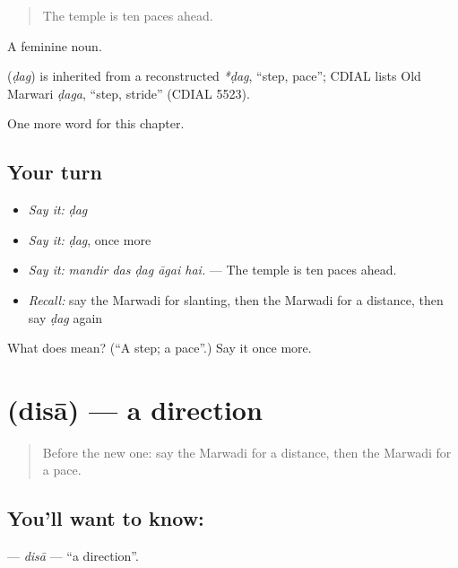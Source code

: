 \begin{quote}
The temple is ten paces ahead.
\end{quote}

A feminine noun.

\begin{cousinweb}
\textbf{} (\emph{ḍag}) is inherited from a reconstructed \emph{*ḍag}, \textquotedblleft{}step, pace\textquotedblright{}; CDIAL lists Old Marwari \emph{ḍaga}, \textquotedblleft{}step, stride\textquotedblright{} (CDIAL 5523).
\end{cousinweb}

\begin{grammarlens}[title={What you've built}]
One more word for this chapter.
\end{grammarlens}

\subsection*{Your turn}
\begin{itemize}
\raggedright
  \item \emph{Say it:} \emph{ḍag}
  \item \emph{Say it:} \emph{ḍag}, once more
  \item \emph{Say it:} \emph{mandir das ḍag āgai hai.} — The temple is ten paces ahead.
  \item \emph{Recall:} say the Marwadi for slanting, then the Marwadi for a distance, then say \emph{ḍag} again
\end{itemize}

\begin{tcolorbox}[breakable,colback=teal!4,colframe=teal!35!black,title={Before you move on}]
What does  mean? (\textquotedblleft{}A step; a pace\textquotedblright{}.) Say it once more.
\end{tcolorbox}
\section[\texorpdfstring{\mw{दिसा} (disā)}{दिसा (disā)}]{ (disā) — a direction}

\label{lesson:MW-C203-disa}



\begin{quote}
Before the new one: say the Marwadi for a distance, then the Marwadi for a pace.
\end{quote}

\subsection*{You'll want to know: }
\textbf{} — \emph{disā} — \textquotedblleft{}a direction\textquotedblright{}.

